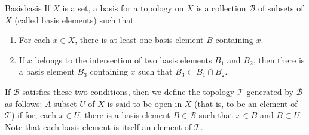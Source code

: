 \begin{definition}{Basis}{basis}
    If $X$ is a set, a basis for a topology on $X$ is a collection $\mathcal{B}$ of subsets of $X$ (called basis elements) such that
    \begin{enumerate}
        \item For each $x \in X$, there is at least one basis element $B$ containing $x$.
        \item If $x$ belongs to the intersection of two basis elements $B_{1}$ and $B_{2}$, then there is a basis element $B_{3}$ containing $x$ such that $B_{3} \subset B_{1} \cap B_{2}$.
    \end{enumerate}
    If $\mathcal{B}$ satisfies these two conditions, then we define the topology $\mathcal{T}$ generated by $\mathcal{B}$ as follows: $A$ subset $U$ of $X$ is said to be open in $X$ (that is, to be an element of $\mathcal{T}$) if for, each $x \in U$, there is a basis element $B \in \mathcal{B}$ such that $x \in B$ and $B \subset U$. Note that each basis element is itself an element of $\mathcal{T}$.
\end{definition}
